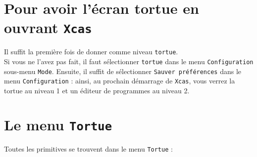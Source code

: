\documentclass[a4paper,11pt]{book}
\begin{document}
\section{Pour avoir l'\'ecran tortue en ouvrant {\tt Xcas}}
Il suffit la premi\`ere fois de donner comme niveau  {\tt tortue}.\\
Si vous ne l'avez pas fait, il faut s\'electionner {\tt tortue}
dans le menu {\tt Configuration} sous-menu {\tt Mode}. Ensuite, il suffit de 
s\'electionner {\tt Sauver pr\'ef\'erences} dans le menu {\tt Configuration} : 
ainsi, au prochain d\'emarrage de {\tt Xcas}, vous verrez la tortue au niveau 1
et un \'editeur de programmes au niveau 2.
\section{Le menu  {\tt Tortue}}
Toutes les primitives se trouvent dans le menu {\tt Tortue} :
\end{document}
